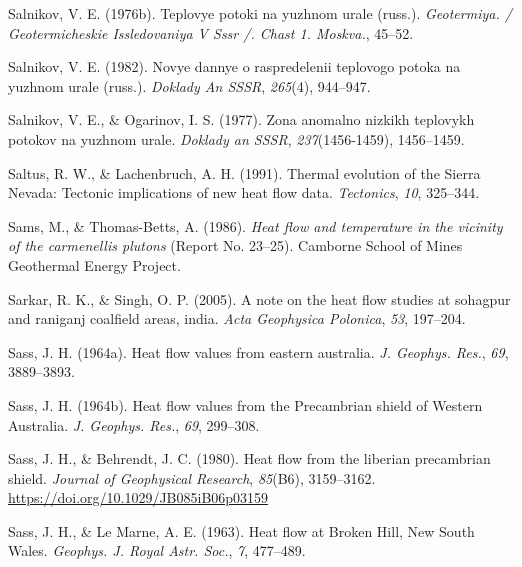 \documentclass[draft,linenumbers]{agujournal2018}
\begin{document}
\leavevmode{}%
Salnikov, V. E. (1976b). Teplovye potoki na yuzhnom urale (russ.).
\emph{Geotermiya. / Geotermicheskie Issledovaniya V Sssr /. Chast 1.
Moskva.}, 45--52.

\leavevmode{}%
Salnikov, V. E. (1982). Novye dannye o raspredelenii teplovogo potoka na
yuzhnom urale (russ.). \emph{Doklady An SSSR}, \emph{265}(4), 944--947.

\leavevmode{}%
Salnikov, V. E., \& Ogarinov, I. S. (1977). Zona anomalno nizkikh
teplovykh potokov na yuzhnom urale. \emph{Doklady an SSSR},
\emph{237}(1456-1459), 1456--1459.

\leavevmode{}%
Saltus, R. W., \& Lachenbruch, A. H. (1991). Thermal evolution of the
{Sierra Nevada}: Tectonic implications of new heat flow data.
\emph{Tectonics}, \emph{10}, 325--344.

\leavevmode{}%
Sams, M., \& Thomas-Betts, A. (1986). \emph{Heat flow and temperature in
the vicinity of the carmenellis plutons} (Report No. 23--25). Camborne
School of Mines Geothermal Energy Project.

\leavevmode{}%
Sarkar, R. K., \& Singh, O. P. (2005). A note on the heat flow studies
at sohagpur and raniganj coalfield areas, india. \emph{Acta Geophysica
Polonica}, \emph{53}, 197--204.

\leavevmode{}%
Sass, J. H. (1964a). Heat flow values from eastern australia. \emph{J.
Geophys. Res.}, \emph{69}, 3889--3893.

\leavevmode{}%
Sass, J. H. (1964b). Heat flow values from the {Precambrian shield of
Western Australia}. \emph{J. Geophys. Res.}, \emph{69}, 299--308.

\leavevmode{}%
Sass, J. H., \& Behrendt, J. C. (1980). Heat flow from the liberian
precambrian shield. \emph{Journal of Geophysical Research},
\emph{85}(B6), 3159--3162. \url{https://doi.org/10.1029/JB085iB06p03159}

\leavevmode{}%
Sass, J. H., \& Le Marne, A. E. (1963). Heat flow at {Broken Hill, New
South Wales}. \emph{Geophys. J. Royal Astr. Soc.}, \emph{7}, 477--489.
\end{document}

